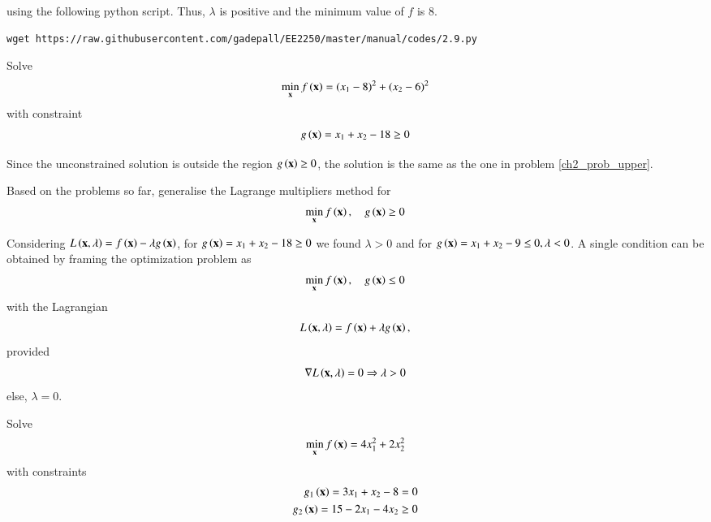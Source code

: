 \documentclass[journal,12pt,twocolumn]{IEEEtran}
\begin{document}
%
using the following python script.  Thus, $\lambda$ is positive and the minimum value of $f$ is 8.
%	
\begin{lstlisting}
wget https://raw.githubusercontent.com/gadepall/EE2250/master/manual/codes/2.9.py
\end{lstlisting}

%
%
\begin{problem}
\label{ch2_prob_upper_cond}
Solve
	 \begin{align}
	 \label{ch2_second_min}
	\min_{\mathbf{x}} f\left(\mathbf{x}\right) = (x_1-8)^2 + (x_2-6)^2
	 \end{align}
	 with constraint
	 \begin{align}
	 \label{ch2_second_const}
	 g\left(\mathbf{x}\right) = x_1 + x_2 - 18 \geq 0 
	 \end{align}
\end{problem}	 
%
\solution Since the unconstrained solution is outside the region $g\left(\mathbf{x}\right) \geq 0$, the solution is the same as the one in problem \ref{ch2_prob_upper}.
%
\begin{problem}
Based on the problems so far, generalise the Lagrange multipliers method for 
%
	 \begin{align}
	 \label{ch2_lagrange_ineq}
	\min_{\mathbf{x}} f\left(\mathbf{x}\right) , \quad 
	 g\left(\mathbf{x}\right)  \geq 0 
	 \end{align}
%
\end{problem}
%
\solution
Considering $L\left(\mathbf{x},\lambda\right) = f\left(\mathbf{x}\right) - \lambda g\left(\mathbf{x}\right)$, for $g\left(\mathbf{x}\right) = x_1 + x_2 - 18 \geq 0$ we found $\lambda > 0 $ and for $g\left(\mathbf{x}\right) = x_1 + x_2 - 9 \leq 0, \lambda < 0$. A single condition can be obtained by framing the optimization problem as
%
	 \begin{align}
	 \label{ch2_lagrange_ineq_summary}
	\min_{\mathbf{x}} f\left(\mathbf{x}\right) , \quad 
	 g\left(\mathbf{x}\right)  \leq 0 
	 \end{align}
%
with the Lagrangian
%
\begin{equation}
L\brak{\mbf{x},\lambda} = f\brak{\mbf{x}} + \lambda g\brak{\mbf{x}}, %
\end{equation}
%
provided
%
\begin{equation}
\label{ch2_kkt_necessary}
\nabla L\left(\mathbf{x},\lambda\right) = 0 \Rightarrow \lambda > 0
\end{equation}
else, $\lambda = 0$.
\begin{problem}
Solve
 \begin{align}
 \label{ch2_kkt_problem}
\min_{\mathbf{x}} f\left(\mathbf{x}\right) = 4x_1^2 + 2x_2^2
 \end{align}
 with constraints
 \begin{align}
 g_1\left(\mathbf{x}\right) = 3x_1 + x_2-8 = 0\\
 g_2 \left(\mathbf{x}\right)= 15 - 2x_1 - 4x_2 \geq 0
 \end{align}
 \end{problem}
\end{document}
